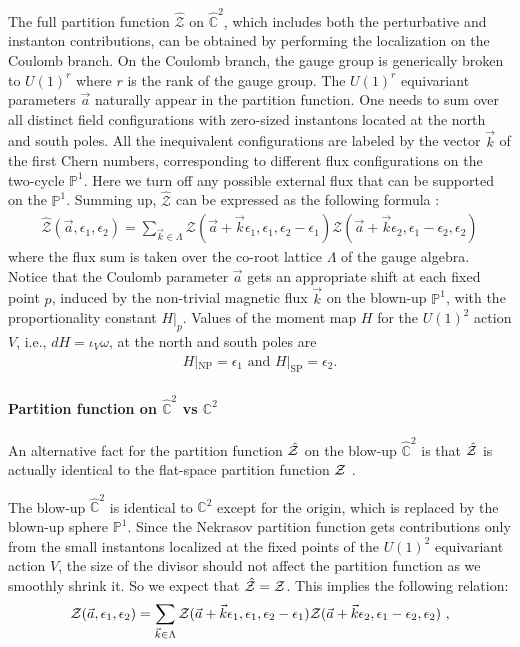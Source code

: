 \documentclass[letterpaper, 11pt]{article}
\def\IC{\mathbb{C}}
\def\IP{\mathbb{P}}
\def\CZ{{\cal Z}}
\def\e{\epsilon}
\begin{document}
The full partition function $\hat{\mathcal Z}$ on $\hat{\IC}^2$, which includes both the perturbative and instanton contributions, can be obtained by performing the localization on the Coulomb branch. On the Coulomb branch, the gauge group is generically broken to $U(1)^r$ where $r$ is the rank of the gauge group. The $U(1)^r$ equivariant parameters $\vec{a}$ naturally appear in the partition function. One needs to sum over all distinct field configurations with zero-sized instantons located at the north and south poles. All the inequivalent configurations are labeled by the vector $\vec{k}$ of the first Chern numbers, corresponding to different flux configurations on the two-cycle $\mathbb{P}^1$. Here we  turn off any possible external flux that can be supported on the $\IP^1$. 
Summing up, $\hat{\mathcal Z}$ can be expressed as the following formula \cite{Nekrasov:2003vi, Gottsche:2006bm, Gottsche:2006tn, Gasparim:2008ri, Bonelli:2012ny}:
\begin{align} \label{eq:blowup}
  \hat{\mathcal Z}(\vec{a}, \e_1, \e_2) = \sum_{\vec{k} \in \Lambda} {\mathcal Z}(\vec{a}+ \vec{k} \e_1, \e_1, \e_2 - \e_1) {\mathcal Z}(\vec{a}+\vec{k} \e_2, \e_1 - \e_2, \e_2) 
 \end{align}
 where the flux sum is taken over the co-root lattice $\Lambda$  of the gauge algebra. Notice that the Coulomb parameter $\vec{a}$ gets an appropriate shift at each fixed point $p$, induced by the non-trivial magnetic flux $\vec{k}$ on the blown-up $\IP^1$, with the proportionality constant $H|_p$. Values of the moment map $H$ for the $U(1)^2$ action $V$, i.e., $dH = \iota_V \omega$, at the north and south poles are 
\begin{align}
  H|_\text{NP} = \epsilon_1 \text{ and } H|_\text{SP} = \epsilon_2.
\end{align}


\paragraph{Partition function on $\hat{\IC}^2$ vs $\IC^2$}
An alternative fact for the partition function $\hat{\CZ}$ on the blow-up $\hat{\IC}^2$ is that $\hat{\CZ}$ is actually identical to the flat-space partition function $\CZ$  \cite{Nakajima:2003pg, Nakajima:2003uh,Nakajima:2005fg}.
 


The blow-up $\hat{\IC}^2$ is identical to $\IC^2$ except for the origin, which is replaced by the blown-up sphere $\IP^1$. 
Since the Nekrasov partition function gets contributions only from the small instantons localized at the fixed points of the $U(1)^2$ equivariant action $V$, the size of the divisor should not affect the partition function as we smoothly shrink it. So we expect that $\hat{\CZ} = \CZ$. This implies the following  relation: \cite{Nakajima:2003pg, Nakajima:2003uh,Nakajima:2005fg,Keller:2012da,Gu:2018gmy,Gu:2019dan}
\begin{align} 
  \label{eq:blowup-generic}
  \CZ(\vec{a}, \e_1, \e_2) = \sum_{\vec{k} \in \Lambda} \CZ(\vec{a}+ \vec{k} \e_1, \e_1, \e_2 - \e_1) \CZ(\vec{a}+\vec{k} \e_2, \e_1 - \e_2, \e_2) \ , 
\end{align}
\end{document}
